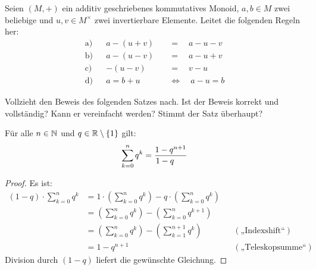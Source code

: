 \begin{aufg}
    Seien $(M,+)$ ein additiv geschriebenes kommutatives Monoid, $a,b\in M$ zwei beliebige und $u,v\in M^\times$ zwei invertierbare Elemente. Leitet die folgenden Regeln her:
    \begin{align*}
        \text{a)} && a-(u+v) \quad&=\quad a-u-v \\
        \text{b)} && a-(u-v) \quad&=\quad a-u+v \\
        \text{c)} && -(u-v) \quad&=\quad v-u \\
        \text{d)} && a=b+u \quad&\Leftrightarrow\quad a-u=b
    \end{align*}
\end{aufg}


\begin{comment}
\begin{aufg}[Kürzbarkeit]
    Sei $(M,*)$ ein Monoid. Ein Element $a\in M$ heißt \textbf{kürzbar}, wenn „Multiplikation mit $a$“ eine Äquivalenzumformung ist, d.h. wenn für alle $x,y\in M$ die beiden Äquivalenzen
    \begin{align*}
        a*x& =a*y \quad \leftrightarrow\quad x=y\\
        \text{und}\qquad x*a& =y*a \quad \leftrightarrow\quad x=y
    \end{align*}
    gelten.
    \begin{enumerate}
        \item Beweist, dass jedes invertierbare Element kürzbar ist.
        \item Ist ein kürzbares Element auch immer invertierbar?
    \end{enumerate}
\end{aufg}
\end{comment}


\begin{aufg} \label{aufg:geometrischereihe}
    Vollzieht den Beweis des folgenden Satzes nach. Ist der Beweis korrekt und vollständig? Kann er vereinfacht werden? Stimmt der Satz überhaupt?
    \begin{satz}
        Für alle $n\in \mathbb N$ und $q\in \mathbb R\setminus \{1\}$ gilt:
            \[ \sum_{k=0}^n q^k = \frac{1-q^{n+1}}{\kern-1.4em1-q} \]
    \end{satz}
    \begin{proof}
        Es ist:
        \begin{align*}
            (1-q) \cdot \sum_{k=0}^n q^k & = 1\cdot \left( \sum_{k=0}^n q^k \right) - q\cdot \left( \sum_{k=0}^n q^k \right) \\
            & = \left( \sum_{k=0}^n q^k \right) - \left( \sum_{k=0}^{n} q^{k+1} \right) \\
            & = \left( \sum_{k=0}^n q^k \right) - \left( \sum_{k=1}^{n+1} q^{k} \right) && (\text{„Indexshift“}) \\
            & = 1 - q^{n+1} && (\text{„Teleskopsumme“})
        \end{align*}
    Division durch $(1-q)$ liefert die gewünschte Gleichung.
    \end{proof}
\end{aufg}

